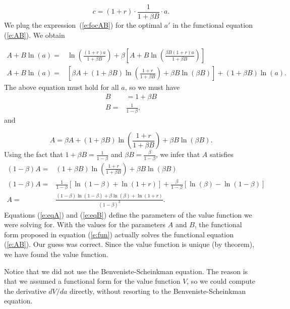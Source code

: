 \documentclass{article}
\begin{document}
\[
c=(1+r)\cdot \frac{1}{1+\beta B} \cdot a.
\]
We plug the expression~(\ref{e:focAB}) for the optimal $a'$ in the functional equation (\ref{e:AB}). We obtain

\[
\begin{align*}
A+B \ln\left(a\right)=&\ln\left(\frac{(1+r) a}{1+\beta B}\right)+\beta \left[A+B \ln\left(\frac{\beta B (1+r) a}{1+\beta B}\right)\right]\\
A+B \ln\left(a\right)=&\left[\beta A+ (1+\beta B) \ln\left(\frac{1+r}{1+\beta B}\right)+\beta B \ln\left(\beta B\right)\right] + (1+\beta B) \ln\left(a\right).
\end{align*}
\]
The above equation must hold for all $a$, so we must have
\wcSpan*[id=equation-17]{}
\setcounter{tpequation}{16}\label{e:eqB}
\[
\begin{align*}
B&= 1+\beta B\\
B=&\frac{1}{1-\beta},\tag{17}
\end{align*}
\]
and

\[
A = \beta A+(1+\beta B) \ln\left(\frac{1+r}{1+\beta B}\right)+\beta B \ln\left(\beta B\right).
\]
Using the fact that $1+\beta B=\frac{1}{1-\beta}$ and $\beta B=\frac{\beta}{1-\beta}$, we infer that $A$ satisfies
\wcSpan*[id=equation-18]{}
\setcounter{tpequation}{17}\label{e:eqA}
\[
\begin{align*}
(1-\beta) A=&(1+\beta B) \ln\left(\frac{1+r}{1+\beta B}\right)+\beta B \ln\left(\beta B\right)\\
(1-\beta) A=&\frac{1}{1-\beta} \left[\ln\left(1-\beta\right)+\ln\left(1+r\right)\right]+\frac{\beta}{1-\beta} \left[\ln\left(\beta\right)-\ln\left(1-\beta\right)\right]\\
A=&\frac{(1-\beta) \ln\left(1-\beta\right)+\beta \ln\left(\beta\right)+\ln\left(1+r\right)}{(1-\beta)^2}.\tag{18}
\end{align*}
\]
Equations (\ref{e:eqA}) and (\ref{e:eqB}) define the parameters of the value function we were solving for. With the values for the parameters $A$ and $B$, the functional form proposed in equation (\ref{e:fun}) actually solves the functional equation (\ref{e:AB}). Our guess was correct. Since the value function is unique (by theorem), we have found the value function.

Notice that we did not use the Benveniste-Scheinkman equation. The reason is that we assumed a functional form for the value function $V$, so we could compute the derivative $d V/d a$ directly, without resorting to the Benveniste-Scheinkman equation.
\end{document}

